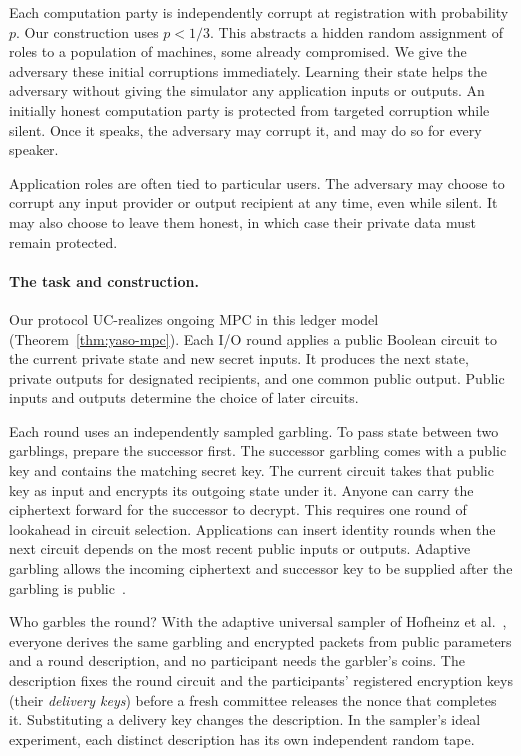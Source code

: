 Each computation party is independently corrupt at registration with
probability $p$.  Our construction uses $p<1/3$.  This abstracts a
hidden random assignment of roles to a population of machines, some
already compromised.  We give the adversary these initial corruptions
immediately.  Learning their state helps the adversary without giving
the simulator any application inputs or outputs.  An initially honest
computation party is protected from targeted corruption while silent.
Once it speaks, the adversary may corrupt it, and may do so for every
speaker.

Application roles are often tied to particular users.  The adversary
may choose to corrupt any input provider or output recipient at any
time, even while silent.  It may also choose to leave them honest, in
which case their private data must remain protected.

\paragraph{The task and construction.}
Our protocol UC-realizes ongoing MPC in this ledger model
(Theorem~\ref{thm:yaso-mpc}).
Each I/O round applies a public Boolean circuit to the current private
state and new secret inputs. It produces the next state, private outputs
for designated recipients, and one common public output. Public inputs
and outputs determine the choice of later circuits.

Each round uses an independently sampled garbling. To pass state between
two garblings, prepare the successor first. The successor
garbling comes with a public key and contains the matching secret key.
The current circuit takes that public key as input and encrypts its
outgoing state under it. Anyone can carry the ciphertext forward for
the successor to decrypt. This requires one round of lookahead in circuit
selection. Applications can insert identity rounds when the next circuit
depends on the most recent public inputs or outputs. Adaptive
garbling allows the incoming ciphertext and successor key to be supplied
after the garbling is public~\cite{HemenwayEtAl2016AdaptiveGarbling}.

Who garbles the round? With the adaptive universal sampler of Hofheinz
et al.~\cite{HofheinzEtAl2016UniversalSamplers}, everyone derives the
same garbling and encrypted packets from public parameters and a round
description, and no participant needs the garbler's coins. The description
fixes the round circuit and the participants' registered encryption keys
(their \emph{delivery keys}) before a fresh committee releases the nonce
that completes it. Substituting a delivery key changes the description.
In the sampler's ideal experiment, each distinct description has its own
independent random tape.

